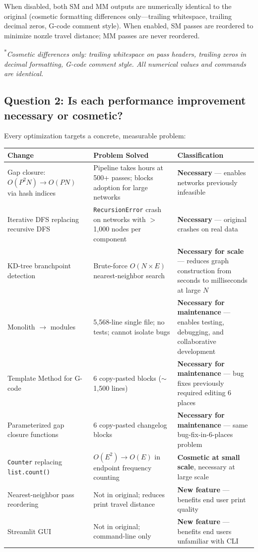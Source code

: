 \documentclass[11pt,a4paper]{article}
\begin{document}
When disabled, both SM and MM outputs are numerically identical to the original (cosmetic formatting differences only---trailing whitespace, trailing decimal zeros, G-code comment style). When enabled, SM passes are reordered to minimize nozzle travel distance; MM passes are never reordered.

\textsuperscript{*}\textit{Cosmetic differences only: trailing whitespace on pass headers, trailing zeros in decimal formatting, G-code comment style. All numerical values and commands are identical.}

\subsection{Question 2: Is each performance improvement necessary or cosmetic?}

Every optimization targets a concrete, measurable problem:

\begin{longtable}{p{5cm}p{4cm}p{5cm}}
\toprule
\textbf{Change} & \textbf{Problem Solved} & \textbf{Classification} \\
\midrule
\endhead
Gap closure: $O(P^2N) \rightarrow O(PN)$ via hash indices & Pipeline takes hours at 500+ passes; blocks adoption for large networks & \textbf{Necessary} --- enables networks previously infeasible \\
\midrule
Iterative DFS replacing recursive DFS & \texttt{RecursionError} crash on networks with $>$1,000 nodes per component & \textbf{Necessary} --- original crashes on real data \\
\midrule
KD-tree branchpoint detection & Brute-force $O(N \times E)$ nearest-neighbor search & \textbf{Necessary for scale} --- reduces graph construction from seconds to milliseconds at large $N$ \\
\midrule
Monolith $\rightarrow$ modules & 5,568-line single file; no tests; cannot isolate bugs & \textbf{Necessary for maintenance} --- enables testing, debugging, and collaborative development \\
\midrule
Template Method for G-code & 6 copy-pasted blocks ($\sim$1,500 lines) & \textbf{Necessary for maintenance} --- bug fixes previously required editing 6 places \\
\midrule
Parameterized gap closure functions & 6 copy-pasted changelog blocks & \textbf{Necessary for maintenance} --- same bug-fix-in-6-places problem \\
\midrule
\texttt{Counter} replacing \texttt{list.count()} & $O(E^2) \rightarrow O(E)$ in endpoint frequency counting & \textbf{Cosmetic at small scale}, necessary at large scale \\
\midrule
Nearest-neighbor pass reordering & Not in original; reduces print travel distance & \textbf{New feature} --- benefits end user print quality \\
\midrule
Streamlit GUI & Not in original; command-line only & \textbf{New feature} --- benefits end users unfamiliar with CLI \\
\bottomrule
\end{longtable}
\end{document}
